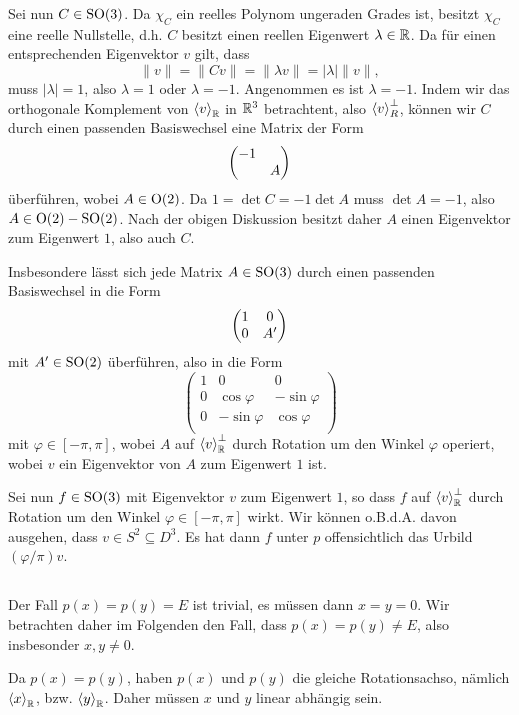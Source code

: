 \documentclass[a4paper,10pt]{article}
\begin{document}
Sei nun $C \in \operatorname{SO}(3)$. Da $\chi_C$ ein reelles Polynom ungeraden Grades ist, besitzt $\chi_C$ eine reelle Nullstelle, d.h. $C$ besitzt einen reellen Eigenwert $\lambda \in \mathbb{R}$. Da für einen entsprechenden Eigenvektor $v$ gilt, dass
\[
 \|v\| = \|Cv\| = \|\lambda v \| = |\lambda| \|v\|,
\]
muss $|\lambda| = 1$, also $\lambda = 1$ oder $\lambda = -1$. Angenommen es ist $\lambda = -1$. Indem wir das orthogonale Komplement von $\left\langle v \right\rangle_{\mathbb{R}}$ in $\mathbb{R}^3$ betrachtent, also $\left\langle v \right\rangle_R^\perp$, können wir $C$ durch einen passenden Basiswechsel eine Matrix der Form
\[
 \begin{pmatrix}-1 & \\ & A\end{pmatrix}
\]
überführen, wobei $A \in \operatorname{O}(2)$. Da $1 = \det C = -1 \det A$ muss $\det A = -1$, also $A \in \operatorname{O}(2) - \operatorname{SO}(2)$. Nach der obigen Diskussion besitzt daher $A$ einen Eigenvektor zum Eigenwert $1$, also auch $C$.

Insbesondere lässt sich jede Matrix $A \in \operatorname{SO}(3)$ durch einen passenden Basiswechsel in die Form
\[
 \begin{pmatrix}1 & 0 \\ 0 & A'\end{pmatrix}
\]
mit $A' \in \operatorname{SO}(2)$ überführen, also in die Form
\[
 \begin{pmatrix}
  1 &             0 &             0 \\
  0 &  \cos \varphi & -\sin \varphi \\
  0 & -\sin \varphi &  \cos \varphi \\
 \end{pmatrix}
\]
mit $\varphi \in [-\pi,\pi]$, wobei $A$ auf $\left\langle v \right\rangle_{\mathbb{R}}^\perp$ durch Rotation um den Winkel $\varphi$ operiert, wobei $v$ ein Eigenvektor von $A$ zum Eigenwert $1$ ist.

Sei nun $f \in \operatorname{SO}(3)$ mit Eigenvektor $v$ zum Eigenwert $1$, so dass $f$ auf $\left\langle v \right\rangle_{\mathbb{R}}^\perp$ durch Rotation um den Winkel $\varphi \in [-\pi,\pi]$ wirkt. Wir können o.B.d.A. davon ausgehen, dass $v \in S^2 \subseteq D^3$. Es hat dann $f$ unter $p$ offensichtlich das Urbild $(\varphi/\pi)v$.


\addtocounter{subsection}{1}
\subsection{}
Der Fall $p(x) = p(y) = E$ ist trivial, es müssen dann $x = y = 0$. Wir betrachten daher im Folgenden den Fall, dass $p(x) = p(y) \neq E$, also insbesonder $x,y \neq 0$.

Da $p(x) = p(y)$, haben $p(x)$ und $p(y)$ die gleiche Rotationsachso, nämlich $\left\langle x \right\rangle_{\mathbb{R}}$, bzw. $\left\langle y \right\rangle_{\mathbb{R}}$. Daher müssen $x$ und $y$ linear abhängig sein.
\end{document}
